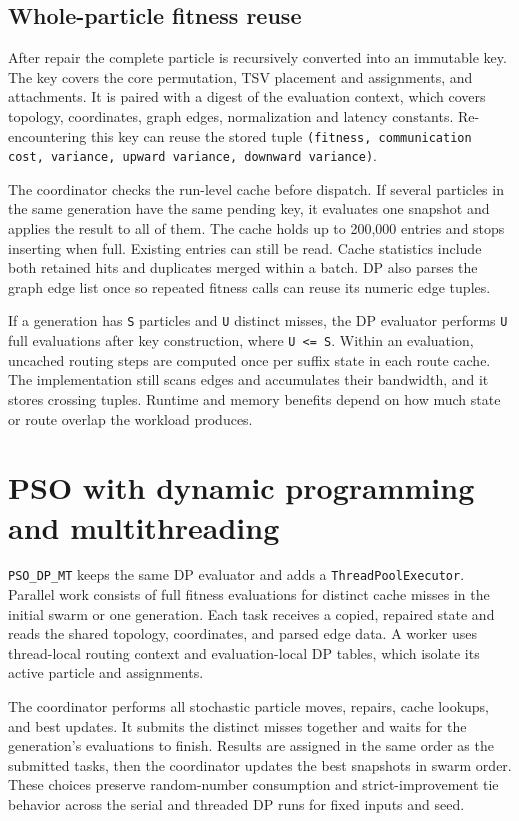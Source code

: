 \documentclass[11pt,a4paper]{article}
\begin{document}
\subsection{Whole-particle fitness reuse}

After repair the complete particle is recursively converted into an immutable key. The key covers the core permutation, TSV placement and assignments, and attachments. It is paired with a digest of the evaluation context, which covers topology, coordinates, graph edges, normalization and latency constants. Re-encountering this key can reuse the stored tuple \texttt{(fitness, communication cost, variance, upward variance, downward variance)}.

The coordinator checks the run-level cache before dispatch. If several particles in the same generation have the same pending key, it evaluates one snapshot and applies the result to all of them. The cache holds up to 200,000 entries and stops inserting when full. Existing entries can still be read. Cache statistics include both retained hits and duplicates merged within a batch. DP also parses the graph edge list once so repeated fitness calls can reuse its numeric edge tuples.

If a generation has \texttt{S} particles and \texttt{U} distinct misses, the DP evaluator performs \texttt{U} full evaluations after key construction, where \texttt{U <= S}. Within an evaluation, uncached routing steps are computed once per suffix state in each route cache. The implementation still scans edges and accumulates their bandwidth, and it stores crossing tuples. Runtime and memory benefits depend on how much state or route overlap the workload produces.

\section{PSO with dynamic programming and multithreading}

\texttt{PSO\_DP\_MT} keeps the same DP evaluator and adds a \texttt{ThreadPoolExecutor}. Parallel work consists of full fitness evaluations for distinct cache misses in the initial swarm or one generation. Each task receives a copied, repaired state and reads the shared topology, coordinates, and parsed edge data. A worker uses thread-local routing context and evaluation-local DP tables, which isolate its active particle and assignments.

The coordinator performs all stochastic particle moves, repairs, cache lookups, and best updates. It submits the distinct misses together and waits for the generation's evaluations to finish. Results are assigned in the same order as the submitted tasks, then the coordinator updates the best snapshots in swarm order. These choices preserve random-number consumption and strict-improvement tie behavior across the serial and threaded DP runs for fixed inputs and seed.
\end{document}
